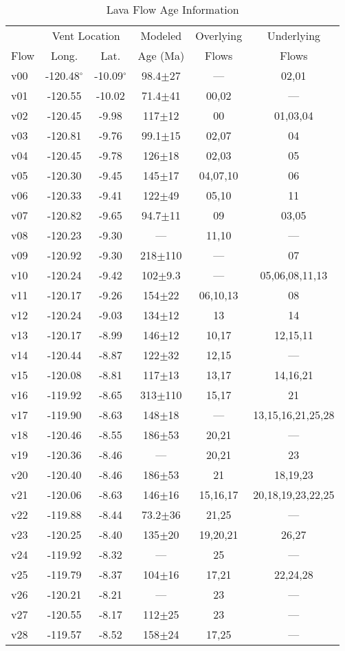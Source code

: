 	\begin{table}[h!]
	\centering
	\caption{Lava Flow Age Information}
	\begin{tabular}{l c c c c c}
		\toprule
			 & \multicolumn{2}{c}{Vent Location}  & Modeled & Overlying & Underlying\\
			Flow & Long. & Lat. & Age (Ma) & Flows & Flows\\
		\midrule
			v00 & -120.48$^{\circ}$ & -10.09$^{\circ}$ & 98.4$\pm$27 & --- & 02,01\\
			v01 & -120.55 & -10.02 & 71.4$\pm$41 & 00,02 & ---\\
			v02 & -120.45 & -9.98 & 117$\pm$12 & 00 & 01,03,04\\
			v03 & -120.81 & -9.76 & 99.1$\pm$15 & 02,07 & 04\\
			v04 & -120.45 & -9.78 & 126$\pm$18 & 02,03 & 05\\
			v05 & -120.30 & -9.45 & 145$\pm$17 & 04,07,10 & 06\\
			v06 & -120.33 & -9.41 & 122$\pm$49 & 05,10 & 11\\
			v07 & -120.82 & -9.65 & 94.7$\pm$11 & 09 & 03,05\\
			v08 & -120.23 & -9.30 & --- & 11,10 & ---\\
			v09 & -120.92 & -9.30 & 218$\pm$110 & --- & 07\\
			v10 & -120.24 & -9.42 & 102$\pm$9.3 & --- & 05,06,08,11,13\\
			v11 & -120.17 & -9.26 & 154$\pm$22 & 06,10,13 & 08\\
			v12 & -120.24 & -9.03 & 134$\pm$12 & 13 & 14\\
			v13 & -120.17 & -8.99 & 146$\pm$12 & 10,17 & 12,15,11\\
			v14 & -120.44 & -8.87 & 122$\pm$32 & 12,15 & ---\\
			v15 & -120.08 & -8.81 & 117$\pm$13 & 13,17 & 14,16,21\\
			v16 & -119.92 & -8.65 & 313$\pm$110 & 15,17 & 21\\
			v17 & -119.90 & -8.63 & 148$\pm$18 & --- & 13,15,16,21,25,28\\
			v18 & -120.46 & -8.55 & 186$\pm$53 & 20,21 & ---\\
			v19 & -120.36 & -8.46 & --- & 20,21 & 23\\
			v20 & -120.40 & -8.46 & 186$\pm$53 & 21 & 18,19,23\\
			v21 & -120.06 & -8.63 & 146$\pm$16 & 15,16,17 & 20,18,19,23,22,25\\
			v22 & -119.88 & -8.44 & 73.2$\pm$36 & 21,25 & ---\\
			v23 & -120.25 & -8.40 & 135$\pm$20 & 19,20,21 & 26,27\\
			v24 & -119.92 & -8.32 & --- & 25 & ---\\
			v25 & -119.79 & -8.37 & 104$\pm$16 & 17,21 & 22,24,28\\
			v26 & -120.21 & -8.21 & --- & 23 & ---\\
			v27 & -120.55 & -8.17 & 112$\pm$25 & 23 & ---\\
			v28 & -119.57 & -8.52 & 158$\pm$24 & 17,25 & ---\\
		\bottomrule
	\end{tabular}
	\label{tab_agedatabase}
	\end{table}


